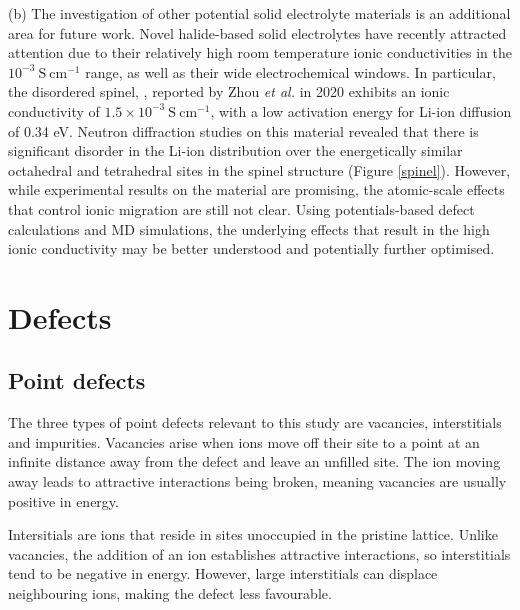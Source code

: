 \documentclass[12pt]{report}
\begin{document}
\noindent
(b) The investigation of other potential solid electrolyte materials is an additional area for future work.
Novel halide-based solid electrolytes have recently attracted attention due to their relatively high room temperature ionic conductivities in the $\mathrm{10^{-3} \ S \ cm^{-1}}$ range, as well as their wide electrochemical windows.
In particular, the disordered spinel, , reported by Zhou \textit{et al.} in 2020 exhibits an ionic conductivity of $\mathrm{1.5 \times 10^{-3} \ S \ cm^{-1}}$, with a low activation energy for Li-ion diffusion of 0.34 eV.\cite{zhou2020}
Neutron diffraction studies on this material revealed that there is significant disorder in the Li-ion distribution over the energetically similar octahedral and tetrahedral sites in the spinel structure (Figure \ref{spinel}).
However, while experimental results on the material are promising, the atomic-scale effects that control ionic migration are still not clear.
Using potentials-based defect calculations and MD simulations, the underlying effects that result in the high ionic conductivity may be better understood and potentially further optimised.





\typeout{}




\clearpage





\appendix
\addappheadtotoc

\chapter{Defects}

\section{Point defects}

The three types of point defects relevant to this study are vacancies, interstitials and impurities.
Vacancies arise when ions move off their site to a point at an infinite distance away from the defect and leave an unfilled site.
The ion moving away leads to attractive interactions being broken, meaning vacancies are usually positive in energy.

Intersitials are ions that reside in sites unoccupied in the pristine lattice.
Unlike vacancies, the addition of an ion establishes attractive interactions, so interstitials tend to be negative in energy.
However, large interstitials can displace neighbouring ions, making the defect less favourable.
\end{document}
